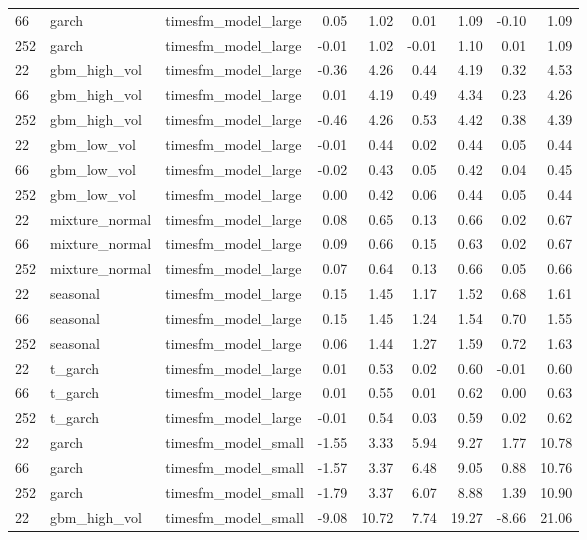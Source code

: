 {\begin{tabular}{lllrrrrrr}
66 & garch & timesfm\_model\_large & 0.05 & 1.02 & 0.01 & 1.09 & -0.10 & 1.09 \\
252 & garch & timesfm\_model\_large & -0.01 & 1.02 & -0.01 & 1.10 & 0.01 & 1.09 \\
\midrule
22 & gbm\_high\_vol & timesfm\_model\_large & -0.36 & 4.26 & 0.44 & 4.19 & 0.32 & 4.53 \\
66 & gbm\_high\_vol & timesfm\_model\_large & 0.01 & 4.19 & 0.49 & 4.34 & 0.23 & 4.26 \\
252 & gbm\_high\_vol & timesfm\_model\_large & -0.46 & 4.26 & 0.53 & 4.42 & 0.38 & 4.39 \\
\midrule
22 & gbm\_low\_vol & timesfm\_model\_large & -0.01 & 0.44 & 0.02 & 0.44 & 0.05 & 0.44 \\
66 & gbm\_low\_vol & timesfm\_model\_large & -0.02 & 0.43 & 0.05 & 0.42 & 0.04 & 0.45 \\
252 & gbm\_low\_vol & timesfm\_model\_large & 0.00 & 0.42 & 0.06 & 0.44 & 0.05 & 0.44 \\
\midrule
22 & mixture\_normal & timesfm\_model\_large & 0.08 & 0.65 & 0.13 & 0.66 & 0.02 & 0.67 \\
66 & mixture\_normal & timesfm\_model\_large & 0.09 & 0.66 & 0.15 & 0.63 & 0.02 & 0.67 \\
252 & mixture\_normal & timesfm\_model\_large & 0.07 & 0.64 & 0.13 & 0.66 & 0.05 & 0.66 \\
\midrule
22 & seasonal & timesfm\_model\_large & 0.15 & 1.45 & 1.17 & 1.52 & 0.68 & 1.61 \\
66 & seasonal & timesfm\_model\_large & 0.15 & 1.45 & 1.24 & 1.54 & 0.70 & 1.55 \\
252 & seasonal & timesfm\_model\_large & 0.06 & 1.44 & 1.27 & 1.59 & 0.72 & 1.63 \\
\midrule
22 & t\_garch & timesfm\_model\_large & 0.01 & 0.53 & 0.02 & 0.60 & -0.01 & 0.60 \\
66 & t\_garch & timesfm\_model\_large & 0.01 & 0.55 & 0.01 & 0.62 & 0.00 & 0.63 \\
252 & t\_garch & timesfm\_model\_large & -0.01 & 0.54 & 0.03 & 0.59 & 0.02 & 0.62 \\
\midrule
22 & garch & timesfm\_model\_small & -1.55 & 3.33 & 5.94 & 9.27 & 1.77 & 10.78 \\
66 & garch & timesfm\_model\_small & -1.57 & 3.37 & 6.48 & 9.05 & 0.88 & 10.76 \\
252 & garch & timesfm\_model\_small & -1.79 & 3.37 & 6.07 & 8.88 & 1.39 & 10.90 \\
\midrule
22 & gbm\_high\_vol & timesfm\_model\_small & -9.08 & 10.72 & 7.74 & 19.27 & -8.66 & 21.06 \\

\end{tabular}}
